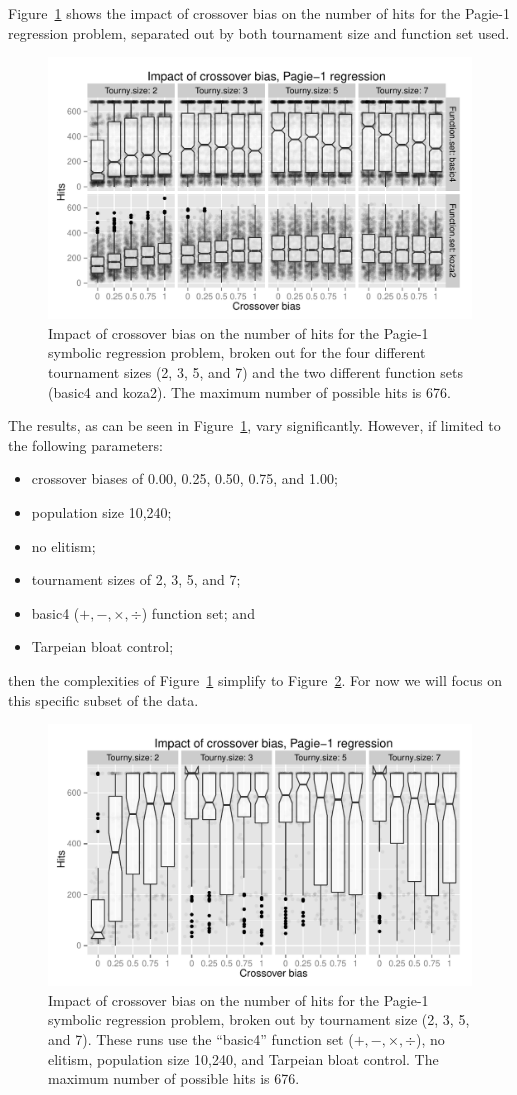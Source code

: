 \documentclass{sig-alternate}
\begin{document}
Figure~\ref{fig:Pagie1Hits_Bias_Tournys_FunctionSet} shows the impact of crossover bias on the number of hits for the
Pagie-1 regression problem, separated out by both tournament size and function set used.

\begin{figure}
\centering
\includegraphics[width=0.45 \textwidth]{Plots/Pagie_1_Hits_vs_Bias_Tournys_FunctionSet.pdf}
\caption{Impact of crossover bias on the number of hits for the Pagie-1 symbolic regression problem, broken out for the
four different tournament sizes (2, 3, 5, and 7) and the two different function sets (basic4 and koza2). The maximum
number of possible hits is 676.}
\label{fig:Pagie1Hits_Bias_Tournys_FunctionSet}
\end{figure}

The results, as can be seen in Figure~\ref{fig:Pagie1Hits_Bias_Tournys_FunctionSet}, vary significantly. However, if limited to the following parameters:
\begin{itemize}
    \item crossover biases of 0.00, 0.25, 0.50, 0.75, and 1.00;
    \item population size 10,240;
    \item no elitism;
    \item tournament sizes of 2, 3, 5, and 7;
	\item basic4 ($+, -, \times, \div$) function set; and
	\item Tarpeian bloat control;
\end{itemize}
then the complexities of Figure~\ref{fig:Pagie1Hits_Bias_Tournys_FunctionSet} simplify to
Figure~\ref{fig:Pagie1StrongHits_Bias_Tournys_FunctionSet}. For now we will focus on this specific subset of the data.

\begin{figure}
\centering
\includegraphics[width=0.45 \textwidth]{Plots/Pagie_1_strong_Hits_vs_Bias_Tournys_FunctionSet.pdf}
\caption{Impact of crossover bias on the number of hits for the Pagie-1 symbolic regression problem, broken out by 
tournament size (2, 3, 5, and 7). These runs use the ``basic4'' function set ($+, -, \times, \div$), no elitism, 
population size 10,240, and Tarpeian bloat control. The maximum number of possible hits is 676.}
\label{fig:Pagie1StrongHits_Bias_Tournys_FunctionSet}
\end{figure}
\end{document}
